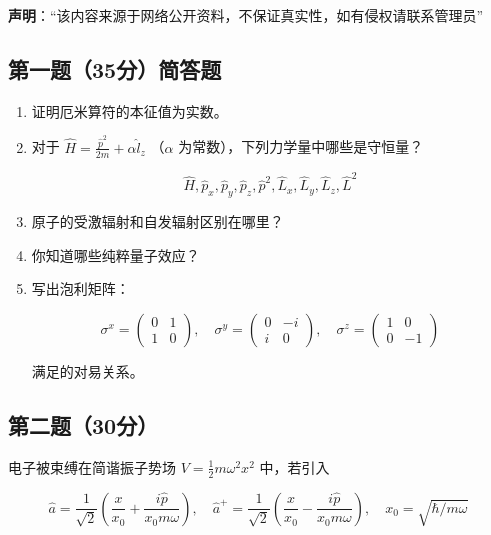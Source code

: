 
\textbf{声明}：“该内容来源于网络公开资料，不保证真实性，如有侵权请联系管理员”

\subsection{第一题（35分）简答题}
\begin{enumerate}
    \item  证明厄米算符的本征值为实数。
    
    \item  对于 $\hat{H} = \frac{\hat{p}^2}{2m} + \alpha \hat{l}_z$ （$\alpha$ 为常数），下列力学量中哪些是守恒量？
    
    \[
    \hat{H}, \hat{p}_x, \hat{p}_y, \hat{p}_z, \hat{p}^2, \hat{L}_x, \hat{L}_y, \hat{L}_z, \hat{L}^2~
    \]
    
    \item  原子的受激辐射和自发辐射区别在哪里？
    
    \item  你知道哪些纯粹量子效应？
    
    \item  写出泡利矩阵：
    
    \[
    \sigma^x = \begin{pmatrix}
    0 & 1 \\
    1 & 0
    \end{pmatrix}, \quad
    \sigma^y = \begin{pmatrix}
    0 & -i \\
    i & 0
    \end{pmatrix}, \quad
    \sigma^z = \begin{pmatrix}
    1 & 0 \\
    0 & -1
    \end{pmatrix}~
    \]
    
    满足的对易关系。
\end{enumerate}
\subsection{第二题（30分）}
电子被束缚在简谐振子势场 $V = \frac{1}{2} m \omega^2 x^2$ 中，若引入

\[
\hat{a} = \frac{1}{\sqrt{2}}\left( \frac{x}{x_0} + \frac{i \hat{p}}{x_0 m \omega} \right), \quad
\hat{a}^+ = \frac{1}{\sqrt{2}}\left( \frac{x}{x_0} - \frac{i \hat{p}}{x_0 m \omega} \right), \quad
x_0 = \sqrt{\hbar/m \omega}~
\]

